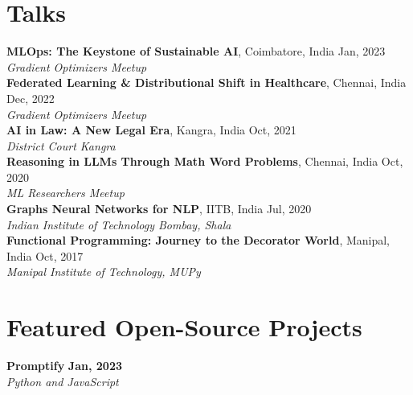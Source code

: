 \documentclass[margin,line]{res}
\begin{document}
\begin{resume}
{{\section{\sc Talks}
{\textbf {MLOps: The Keystone of Sustainable AI}, Coimbatore, India \hfill {Jan, 2023}}\\
{\em Gradient Optimizers Meetup }
\vspace*{.3cm}\\
{\textbf {Federated Learning \& Distributional Shift in Healthcare}, Chennai, India \hfill {Dec, 2022}}\\
{\em Gradient Optimizers Meetup }
\vspace*{.3cm}\\
{\textbf {AI in Law: A New Legal Era}, Kangra, India \hfill  {Oct, 2021}}\\
{\em District Court Kangra }
\vspace*{.3cm}\\
{\textbf {Reasoning in LLMs Through Math Word Problems}, Chennai, India \hfill {Oct, 2020}}\\
{\em ML Researchers Meetup }
\vspace*{.3cm}\\
{\textbf {Graphs Neural Networks for NLP}, IITB, India \hfill  Jul, 2020\\
{\em Indian Institute of Technology Bombay, Shala }}
\vspace*{.3cm}\\
{\textbf {Functional Programming: Journey to the Decorator World}, Manipal, India \hfill  Oct, 2017\\
{\em Manipal Institute of Technology, MUPy }}
\vspace*{.3cm}\\


\section{\sc Featured Open-Source Projects}

{\textbf{Promptify}} \hfill {\bf{Jan, 2023}}\\
{\em Python and JavaScript} \hfill {\href{https://github.com/promptslab/Promptify/}{\color{blue}{\textbf{[Github]}}}}

}}
\end{resume}
\end{document}
